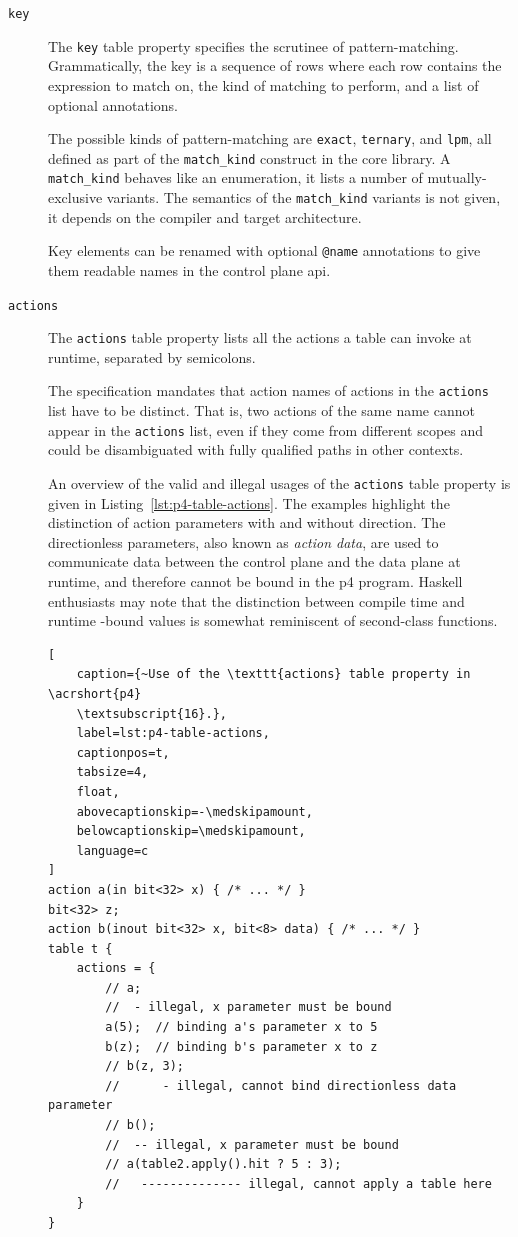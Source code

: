 \begin{description}

\item[\texttt{key}] The \texttt{key} table property specifies the scrutinee of
pattern-matching. Grammatically, the key is a sequence of rows where each row
contains the expression to match on, the kind of matching to perform, and a list
of optional annotations.

The possible kinds of pattern-matching are \texttt{exact}, \texttt{ternary}, and
\texttt{lpm}, all defined as part of the \texttt{match\_kind} construct in the
core library. A \texttt{match\_kind} behaves like an enumeration, it lists a
number of mutually-exclusive variants. The semantics of the \texttt{match\_kind}
variants is not given, it depends on the compiler and target architecture.

Key elements can be renamed with optional \texttt{@name} annotations to give
them readable names in the control plane \acrshort{api}.

\item[\texttt{actions}] The \texttt{actions} table property lists all the
actions a table can invoke at runtime, separated by semicolons.

The specification mandates that action names of actions in the \texttt{actions}
list have to be distinct. That is, two actions of the same name cannot appear in
the \texttt{actions} list, even if they come from different scopes and could be
disambiguated with fully qualified paths in other contexts.

An overview of the valid and illegal usages of the \texttt{actions} table
property is given in Listing~\ref{lst:p4-table-actions}. The examples highlight
the distinction of action parameters with and without direction. The
directionless parameters, also known as \emph{action data}, are used to
communicate data between the control plane and the data plane at runtime, and
therefore cannot be bound in the \acrshort{p4} program. Haskell enthusiasts may
note that the distinction between compile time and runtime -bound values is
somewhat reminiscent of second-class functions.

\begin{lstlisting}[
	caption={~Use of the \texttt{actions} table property in \acrshort{p4}
	\textsubscript{16}.},
	label=lst:p4-table-actions,
	captionpos=t,
	tabsize=4,
	float,
	abovecaptionskip=-\medskipamount,
	belowcaptionskip=\medskipamount,
	language=c
]
action a(in bit<32> x) { /* ... */ }
bit<32> z;
action b(inout bit<32> x, bit<8> data) { /* ... */ }
table t {
	actions = {
		// a;
		//  - illegal, x parameter must be bound
		a(5);  // binding a's parameter x to 5
		b(z);  // binding b's parameter x to z
		// b(z, 3);
		//      - illegal, cannot bind directionless data parameter
		// b();
		//  -- illegal, x parameter must be bound
		// a(table2.apply().hit ? 5 : 3);
		//   -------------- illegal, cannot apply a table here
	}
}
\end{lstlisting}


\end{description}
